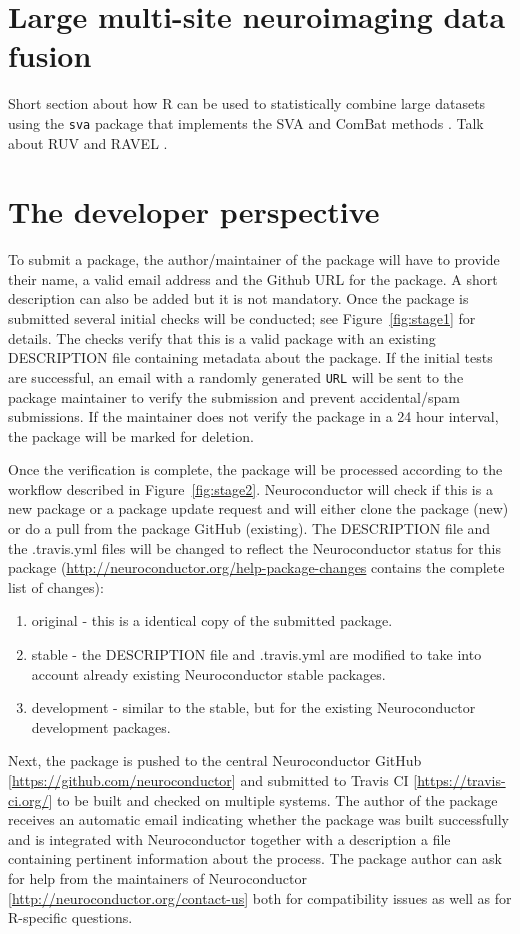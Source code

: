 \documentclass[]{elsarticle} %
\begin{document}
\section{Large multi-site neuroimaging data fusion}\label{sec:datafusion}
Short section about how R can be used to statistically combine large datasets using the \texttt{sva} package \citep{svapackage} that implements the SVA and ComBat methods \citep{combat}. Talk about RUV and RAVEL \citep{ravel}. 

\section{The developer perspective}\label{section:dev_perspective}
To submit a package, the author/maintainer of the package will have to provide their name, a valid email address and the Github URL for the package. A short description can also be added but it is not mandatory. Once the package is submitted several initial checks will be conducted; see Figure~\ref{fig:stage1} for details. The checks verify that this is a valid package with an existing DESCRIPTION file containing metadata about the package. If the initial tests are successful, an email with a randomly generated \texttt{URL} will be sent to the package maintainer to verify the submission and prevent accidental/spam submissions. If the maintainer does not verify the package in a 24 hour interval, the package will be marked for deletion. 

Once the verification is complete, the package will be processed according to the workflow described in Figure~\ref{fig:stage2}. Neuroconductor will check if this is a new package or a package update request and will either clone the package (new) or do a pull from the package GitHub (existing). The DESCRIPTION file and the .travis.yml files will be changed to reflect the Neuroconductor status for this package (\url{http://neuroconductor.org/help-package-changes} contains the complete list of changes):
\begin{enumerate}
\item original - this is a identical copy of the submitted package.
\item stable - the DESCRIPTION file and .travis.yml are modified to take into account already existing Neuroconductor stable packages.
\item development - similar to the stable, but for the existing Neuroconductor development packages.
\end{enumerate}
Next, the package is pushed to the central Neuroconductor GitHub [\url{https://github.com/neuroconductor}] and submitted to Travis CI [\url{https://travis-ci.org/}] to be built and checked on multiple systems. The author of the package receives an automatic email indicating whether the package was built successfully and is integrated with Neuroconductor together with a description a file containing pertinent information about the process. The package author can ask for help from the maintainers of Neuroconductor [\url{http://neuroconductor.org/contact-us}] both for compatibility issues as well as for R-specific questions. 
\end{document}
